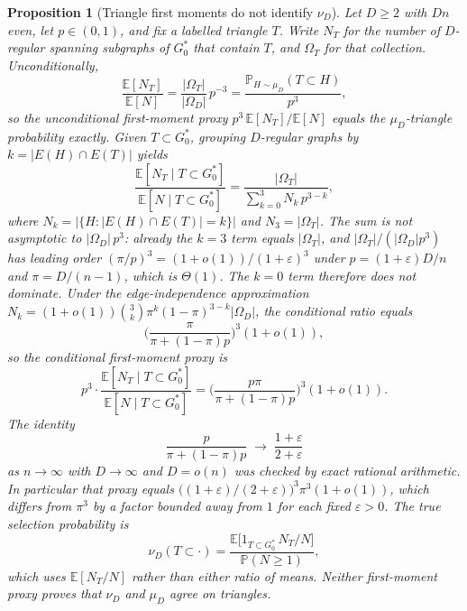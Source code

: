 \documentclass[11pt]{article}
\newtheorem{proposition}[theorem]{Proposition}
\newcommand{\EE}{\mathbb{E}}
\newcommand{\PP}{\mathbb{P}}
\begin{document}
\begin{proposition}[Triangle first moments do not identify \(\nu_D\)]
\label{prop:triangle-proxy}
Let \(D\ge 2\) with \(Dn\) even, let \(p\in(0,1)\), and fix a labelled triangle
\(T\).
Write \(N_T\) for the number of \(D\)-regular spanning subgraphs of \(G^*_0\) that
contain \(T\), and \(\Omega_T\) for that collection.
Unconditionally,
\[
\frac{\EE[N_T]}{\EE[N]}
=
\frac{\lvert\Omega_T\rvert}{\lvert\Omega_D\rvert}\,p^{-3}
=
\frac{\PP_{H\sim\mu_D}(T\subset H)}{p^3},
\]
so the unconditional first-moment proxy \(p^3\,\EE[N_T]/\EE[N]\) equals the
\(\mu_D\)-triangle probability exactly.
Given \(T\subset G^*_0\), grouping \(D\)-regular graphs by
\(k=\lvert E(H)\cap E(T)\rvert\) yields
\[
\frac{\EE[N_T\mid T\subset G^*_0]}{\EE[N\mid T\subset G^*_0]}
=
\frac{\lvert\Omega_T\rvert}{\sum_{k=0}^{3}N_k\,p^{3-k}},
\]
where \(N_k=\lvert\{H:\lvert E(H)\cap E(T)\rvert=k\}\rvert\) and \(N_3=\lvert\Omega_T\rvert\).
The sum is not asymptotic to \(\lvert\Omega_D\rvert\,p^3\): already the \(k=3\)
term equals \(\lvert\Omega_T\rvert\), and
\(\lvert\Omega_T\rvert/(\lvert\Omega_D\rvert p^3)\) has leading order
\((\pi/p)^3=(1+o(1))/(1+\varepsilon)^3\) under \(p=(1+\varepsilon)D/n\) and
\(\pi=D/(n-1)\), which is \(\Theta(1)\).
The \(k=0\) term therefore does not dominate.
Under the edge-independence approximation
\(N_k=(1+o(1))\binom{3}{k}\pi^k(1-\pi)^{3-k}\lvert\Omega_D\rvert\), the
conditional ratio equals
\[
\biggl(\frac{\pi}{\pi+(1-\pi)p}\biggr)^3(1+o(1)),
\]
so the conditional first-moment proxy is
\[
p^3\cdot\frac{\EE[N_T\mid T\subset G^*_0]}{\EE[N\mid T\subset G^*_0]}
=
\biggl(\frac{p\pi}{\pi+(1-\pi)p}\biggr)^3(1+o(1)).
\]
The identity
\[
\frac{p}{\pi+(1-\pi)p}
\;\longrightarrow\;
\frac{1+\varepsilon}{2+\varepsilon}
\]
as \(n\to\infty\) with \(D\to\infty\) and \(D=o(n)\) was checked by exact
rational arithmetic.
In particular that proxy equals
\(\bigl((1+\varepsilon)/(2+\varepsilon)\bigr)^3\pi^3(1+o(1))\), which differs from
\(\pi^3\) by a factor bounded away from \(1\) for each fixed \(\varepsilon>0\).
The true selection probability is
\[
\nu_D(T\subset\cdot)
=
\frac{\EE\bigl[1_{T\subset G^*_0}\,N_T/N\bigr]}{\PP(N\ge 1)},
\]
which uses \(\EE[N_T/N]\) rather than either ratio of means.
Neither first-moment proxy proves that \(\nu_D\) and \(\mu_D\) agree on triangles.
\end{proposition}
\end{document}
